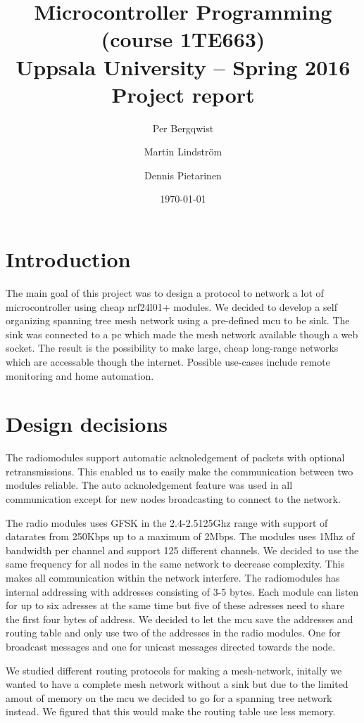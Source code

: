\documentclass[a4paper,11pt]{article}
\title{\textbf{Microcontroller Programming (course 1TE663) \\
    Uppsala University -- Spring 2016 \\
    Project report}}
\author{Per Bergqwist \and Martin Lindström \and Dennis Pietarinen}
\date{\today}
\begin{document}
\maketitle

\tableofcontents

\section{Introduction}
The main goal of this project was to design a protocol to network a
lot of microcontroller using cheap nrf24l01+ modules.  We decided to
develop a self organizing spanning tree mesh network using a
pre-defined mcu to be sink.  The sink was connected to a pc which made
the mesh network available though a web socket.  The result is the
possibility to make large, cheap long-range networks which are
accessable though the internet.  Possible use-cases include remote
monitoring and home automation.

\section{Design decisions}
The radiomodules support automatic acknoledgement of packets with
optional retransmissions. This enabled us to easily make the
communication between two modules reliable. The auto acknoledgement
feature was used in all communication except for new nodes
broadcasting to connect to the network.

The radio modules uses GFSK in the 2.4-2.5125Ghz range with support of
datarates from 250Kbps up to a maximum of 2Mbps. The modules uses 1Mhz
of bandwidth per channel and support 125 different channels. We
decided to use the same frequency for all nodes in the same network to
decrease complexity. This makes all communication within the network
interfere.  The radiomodules has internal addressing with addresses
consisting of 3-5 bytes. Each module can listen for up to six adresses
at the same time but five of these adresses need to share the first
four bytes of address. We decided to let the mcu save the addresses
and routing table and only use two of the addresses in the radio
modules. One for broadcast messages and one for unicast messages
directed towards the node.

We studied different routing protocols for making a mesh-network,
initally we wanted to have a complete mesh network without a sink but
due to the limited amout of memory on the mcu we decided to go for a
spanning tree network instead. We figured that this would make the
routing table use less memory.
\end{document}
